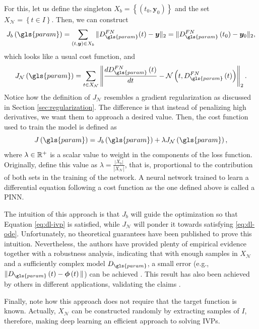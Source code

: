 For this, let us define the singleton $X_b=\left\{ \left( t_0,\bm{y}_0 \right)  \right\} $ and the set $X_{\mathcal{N}}=\left\{ t\in I \right\} $. Then, we can construct \[
    J_b\left( \gls{param} \right) = \sum_{\left( t,\bm{y} \right) \in X_b } \|D^{FN}_{\gls{param}}(t) - \bm{y}\|_2 = \|D^{FN}_{\gls{param}}\left( t_0 \right) -\bm{y}_0\|_2
,\] which looks like a usual cost function, and \[
J_{\mathcal{N}}\left( \gls{param} \right) = \sum_{t \in X_{\mathcal{N}}} \left\| \frac{d D^{FN}_{\gls{param}}\left( t \right) }{dt} - \mathcal{N}\left( t,D^{FN}_{\gls{param}}\left( t \right)  \right)  \right\|_2
.\]
Notice how the definition of $J_{\mathcal{N}}$ resembles a gradient regularization as discussed in Section \ref{sec:regularization}.
The difference is that instead of penalizing high derivatives, we want them to approach a desired value.
Then, the cost function used to train the model is defined as \[
J\left( \gls{param} \right) = J_b\left( \gls{param} \right) + \lambda J_{\mathcal{N}}\left( \gls{param} \right) 
,\] where $\lambda \in \mathbb{R}^+$ is a scalar value to weight in the components of the loss function.
Originally, \textcite{Raissi2019} define this value as $\lambda = \frac{|X_{b}|}{|X_{\mathcal{N}}|}$, that is, proportional to the contribution of both sets in the training of the network.
A neural network trained to learn a differential equation following a cost function as the one defined above is called a \gls{PINN}.

The intuition of this approach is that $J_b$ will guide the optimization so that Equation \eqref{eq:dl-ivp} is satisfied, while  $J_{\mathcal{N}}$ will ponder it towards satisfying \eqref{eq:dl-ode}.
Unfortunately, no theoretical guarantees have been published to prove this intuition.
Nevertheless, the authors have provided plenty of empirical evidence together with a robustness analysis, indicating that with enough samples in $X_{\mathcal{N}}$ and a sufficiently complex model $D_{\gls{param}}$, a small error (e.g., $\|D_{\gls{param}}\left( t \right)-\bm{\phi}\left( t \right) \| $) can be achieved \cite{Raissi2019}.
This result has also been achieved by others in different applications, validating the claims \cite{noakoasteen_physics-informed_2020,zhang_physics-informed_2020,Arnold2021,Yucesan2022}.

Finally, note how this approach does not require that the target function is known.
Actually, $X_{\mathcal{N}}$ can be constructed randomly by extracting samples of $I$,
therefore, making deep learning an efficient approach to solving \gls{IVP}s.

